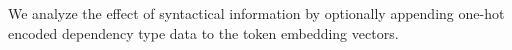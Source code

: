 We analyze the effect of syntactical information by optionally appending one-hot encoded dependency type data to the token embedding vectors. 


\fi
